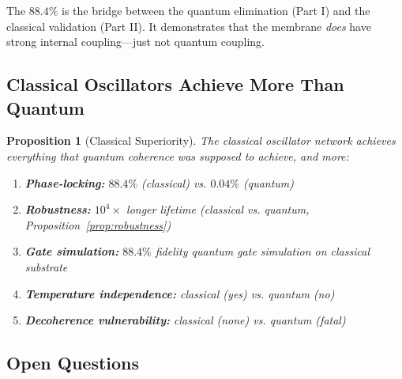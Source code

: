 \documentclass[twocolumn,10pt,a4paper]{article}
\newtheorem{proposition}[theorem]{Proposition}
\theoremstyle{definition}
\theoremstyle{remark}
\begin{document}
The $88.4\%$ is the bridge between the quantum elimination (Part I) and the classical validation (Part II). It demonstrates that the membrane \emph{does} have strong internal coupling---just not quantum coupling.

\subsection{Classical Oscillators Achieve More Than Quantum}

\begin{proposition}[Classical Superiority]
\label{prop:superiority}
The classical oscillator network achieves everything that quantum coherence was supposed to achieve, and more:
\begin{enumerate}[label=(\roman*)]
    \item \textbf{Phase-locking:} $88.4\%$ (classical) vs. $0.04\%$ (quantum)
    \item \textbf{Robustness:} $10^4\times$ longer lifetime (classical vs. quantum, Proposition~\ref{prop:robustness})
    \item \textbf{Gate simulation:} $88.4\%$ fidelity quantum gate simulation on classical substrate
    \item \textbf{Temperature independence:} classical (yes) vs. quantum (no)
    \item \textbf{Decoherence vulnerability:} classical (none) vs. quantum (fatal)
\end{enumerate}
\end{proposition}

\subsection{Open Questions}
\end{document}
